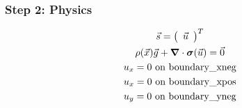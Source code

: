 \documentclass[aspectratio=169]{beamer}
\begin{document}
\begin{frame}
  \frametitle{Step 2: Physics}
  \summary{}

  \begin{minipage}{0.3\textwidth}
    {\scriptsize
    \begin{gather*}
    \vec{s} = \left(\begin{array}{c} \vec{u} \end{array}\right)^T \\
    \rho(\vec{x}) \vec{g} + \bm{\nabla} \cdot \bm{\sigma}(\vec{u}) = \vec{0} \\
    u_x = 0 \text{ on boundary\_xneg} \\
    u_x = 0 \text{ on boundary\_xpos} \\
    u_y = 0 \text{ on boundary\_yneg} \\
    \end{gather*}}
  \end{minipage}
  \hfill
  \begin{minipage}{0.67\textwidth}
  \end{minipage}
      
\end{frame}
\end{document}
